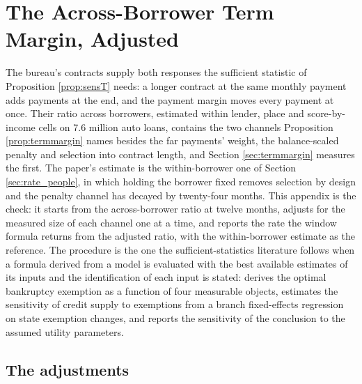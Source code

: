 \section{The Across-Borrower Term Margin, Adjusted}\label{appendix:ladder}

The bureau's contracts supply both responses the sufficient statistic of Proposition \ref{prop:sensT} needs: a longer contract at the same monthly payment adds payments at the end, and the payment margin moves every payment at once. Their ratio across borrowers, estimated within lender, place and score-by-income cells on 7.6 million auto loans, contains the two channels Proposition \ref{prop:termmargin} names besides the far payments' weight, the balance-scaled penalty and selection into contract length, and Section \ref{sec:termmargin} measures the first. The paper's estimate is the within-borrower one of Section \ref{sec:rate_people}, in which holding the borrower fixed removes selection by design and the penalty channel has decayed by twenty-four months. This appendix is the check: it starts from the across-borrower ratio at twelve months, adjusts for the measured size of each channel one at a time, and reports the rate the window formula returns from the adjusted ratio, with the within-borrower estimate as the reference. The procedure is the one the sufficient-statistics literature follows when a formula derived from a model is evaluated with the best available estimates of its inputs and the identification of each input is stated: \citet{davila_exemptions_2020} derives the optimal bankruptcy exemption as a function of four measurable objects, estimates the sensitivity of credit supply to exemptions from a branch fixed-effects regression on state exemption changes, and reports the sensitivity of the conclusion to the assumed utility parameters.

\subsection{The adjustments}

